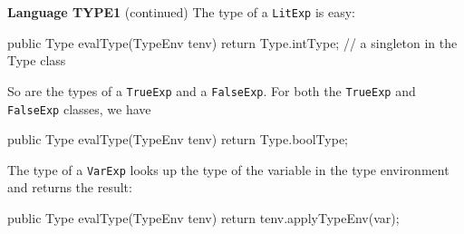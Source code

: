 \begin{minipage}[t]{\sw}
\slidenumber
\LARGE
{\bf Language TYPE1} (continued)\exx
\Large
The type of a \verb'LitExp' is easy:
\begin{qv}
public Type evalType(TypeEnv tenv) {
    return Type.intType; // a singleton in the Type class
}
\end{qv}
So are the types of a \verb'TrueExp' and a \verb'FalseExp'.
For both the \verb'TrueExp' and \verb'FalseExp' classes, we have
\begin{qv}
public Type evalType(TypeEnv tenv) {
    return Type.boolType;
}
\end{qv}
The type of a \verb'VarExp' looks up the type of the variable
in the type environment and returns the result:
\begin{qv}
public Type evalType(TypeEnv tenv) {
    return tenv.applyTypeEnv(var);
}
\end{qv}
\end{minipage}

